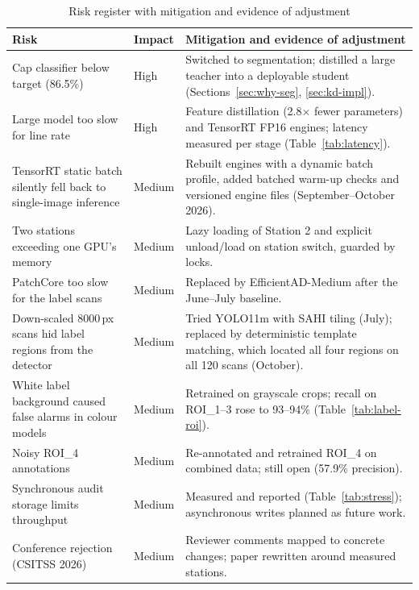 \begin{table}[htbp]
\centering
\caption{Risk register with mitigation and evidence of adjustment}
\label{tab:risks}
\begin{tabularx}{\textwidth}{|L{3.6cm}|L{1.6cm}|X|}
\hline
\textbf{Risk} & \textbf{Impact} & \textbf{Mitigation and evidence of adjustment} \\ \hline
Cap classifier below target (86.5\%) & High & Switched to segmentation; distilled a large teacher into a deployable student (Sections~\ref{sec:why-seg}, \ref{sec:kd-impl}). \\ \hline
Large model too slow for line rate & High & Feature distillation (2.8$\times$ fewer parameters) and TensorRT FP16 engines; latency measured per stage (Table~\ref{tab:latency}). \\ \hline
TensorRT static batch silently fell back to single-image inference & Medium & Rebuilt engines with a dynamic batch profile, added batched warm-up checks and versioned engine files (September--October 2026). \\ \hline
Two stations exceeding one GPU's memory & Medium & Lazy loading of Station 2 and explicit unload/load on station switch, guarded by locks. \\ \hline
PatchCore too slow for the label scans & Medium & Replaced by EfficientAD-Medium after the June--July baseline. \\ \hline
Down-scaled 8000\,px scans hid label regions from the detector & Medium & Tried YOLO11m with SAHI tiling (July); replaced by deterministic template matching, which located all four regions on all 120 scans (October). \\ \hline
White label background caused false alarms in colour models & Medium & Retrained on grayscale crops; recall on ROI\_1--3 rose to 93--94\% (Table~\ref{tab:label-roi}). \\ \hline
Noisy ROI\_4 annotations & Medium & Re-annotated and retrained ROI\_4 on combined data; still open (57.9\% precision). \\ \hline
Synchronous audit storage limits throughput & Medium & Measured and reported (Table~\ref{tab:stress}); asynchronous writes planned as future work. \\ \hline
Conference rejection (CSITSS 2026) & Medium & Reviewer comments mapped to concrete changes; paper rewritten around measured stations. \\ \hline
\end{tabularx}
\end{table}

